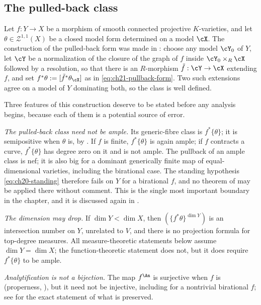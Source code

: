 \subsection{The pulled-back class}
\label{sec:ch30-pullback-class}

Let $f:Y\to X$ be a morphism of smooth connected projective
$K$-varieties, and let $\theta\in\mathcal Z^{1,1}(X)$ be a closed model
form determined on a model $\cX$.  The construction of the pulled-back
form was made in : choose any model $\cY_0$ of
$Y$, let $\cY$ be a normalization of the closure of the graph of $f$
inside $\cY_0\times_R\cX$ followed by a resolution, so that there is an
$R$-morphism $\tilde f:\cY\to\cX$ extending $f$, and set
$f^*\theta:=[\tilde f^*\theta_{\cX}]$ as in
\eqref{eq:ch21-pullback-form}.  Two such extensions agree on a model of
$Y$ dominating both, so the class is well defined.

Three features of this construction deserve to be stated before any analysis
begins, because each of them is a potential source of error.

\emph{The pulled-back class need not be ample.}  Its generic-fibre class is $f^*\{\theta\}$; it is semipositive when
$\theta$ is, by .
If $f$ is finite, $f^*\{\theta\}$ is again ample; if $f$ contracts a
curve, $f^*\{\theta\}$ has degree zero on it and is not ample.
The pullback of an ample class is nef; it is also big for a dominant
generically finite map of equal-dimensional varieties, including the
birational case.
The standing hypothesis \eqref{eq:ch20-standing} therefore fails on $Y$
for a birational $f$, and no theorem of
 may be applied there without
comment.  This is the single most important boundary in the chapter, and it
is discussed again in .

\emph{The dimension may drop.}  If $\dim Y<\dim X$, then
$(\{f^*\theta\}^{\dim Y})$ is an intersection number on $Y$, unrelated to
$V$, and there is no projection formula for top-degree measures.  All
measure-theoretic statements below assume $\dim Y=\dim X$; the
function-theoretic statement  does not, but it
does require $f^*\{\theta\}$ to be ample.

\emph{Analytification is not a bijection.}  The map $f^{\An}$ is
surjective when $f$ is (properness, ), but
it need not be injective, including for a nontrivial birational $f$; see
 for the exact statement of what is
preserved.

